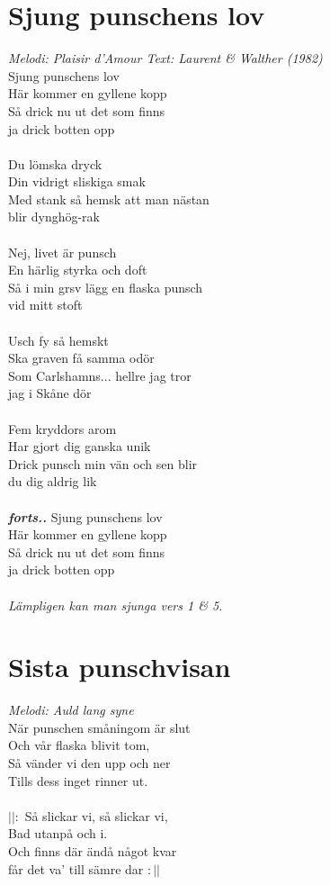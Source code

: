 \section{Sjung punschens lov}
\textit{Melodi: Plaisir d'Amour \hspace{5mm} Text: Laurent \& Walther (1982)}
\vspace{2mm}\\
Sjung punschens lov\\
Här kommer en gyllene kopp\\
Så drick nu ut det som finns\\
ja drick botten opp\\
\\
Du lömska dryck\\
Din vidrigt sliskiga smak\\
Med stank så hemsk att man nästan\\
blir dynghög-rak\\
\\
Nej, livet är punsch\\
En härlig styrka och doft\\
Så i min grsv lägg en flaska punsch\\
vid mitt stoft\\
\\
Usch fy så hemskt\\
Ska graven få samma odör\\
Som Carlshamns... hellre jag tror\\
jag i Skåne dör\\
\\
Fem kryddors arom\\
Har gjort dig ganska unik\\
Drick punsch min vän och sen blir\\
du dig aldrig lik\\
\\
\textbf{\textit{forts..}}
\newpage
\noindent Sjung punschens lov\\
Här kommer en gyllene kopp\\
Så drick nu ut det som finns\\
ja drick botten opp\\
\\
\textit{Lämpligen kan man sjunga vers 1 \& 5.}

\section{Sista punschvisan}
\textit{Melodi: Auld lang syne}
\vspace{2mm}\\
När punschen småningom är slut\\
Och vår flaska blivit tom,\\
Så vänder vi den upp och ner\\
Tills dess inget rinner ut.\\
\\
$||:$ Så slickar vi, så slickar vi,\\
Bad utanpå och i.\\
Och finns där ändå något kvar\\
får det va' till sämre dar $:||$
